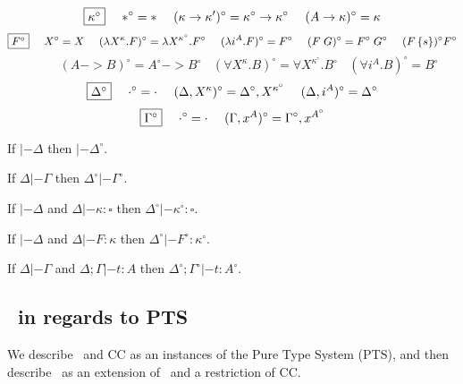 \begin{definition}
\[ \fbox{$\kappa^\circ$}
 ~~~~
 *^\circ =
 *
 ~~~~
 (\kappa -> \kappa')^\circ =
 \kappa^\circ -> \kappa^\circ
 ~~~~
 (A -> \kappa)^\circ =
 \kappa
\]
\[ \fbox{$F^\circ$}
 ~~~~
 X^\circ =
 X
 ~~~~
 (\lambda X^\kappa.F)^\circ =
 \lambda X^{\kappa^\circ}.F^\circ
 ~~~~
 (\lambda i^A.F)^\circ =
 F^\circ
 ~~~~
 (F\;G)^\circ =
 F^\circ\;G^\circ
 ~~~~
 (F\,\{s\})^\circ
 F^\circ
\]
\[ ~~~~ ~~~~ ~~~~
 (A -> B)^\circ =
 A^\circ -> B^\circ
 ~~~~
 (\forall X^\kappa . B)^\circ =
 \forall X^{\kappa^\circ} . B^\circ
 ~~~~
 (\forall i^A . B)^\circ =
 B^\circ
\]
\[ \fbox{$\Delta^\circ$}
 ~~~~
 \cdot^\circ = \cdot
 ~~~~
 (\Delta,X^\kappa)^\circ = \Delta^\circ,X^{\kappa^\circ}
 ~~~~
 (\Delta,i^A)^\circ = \Delta^\circ
\]
\[ \fbox{$\Gamma^\circ$}
 ~~~~
 \cdot^\circ = \cdot
 ~~~~
 (\Gamma,x^A)^\circ = \Gamma^\circ,x^{A^\circ}
\]
\end{definition}

\begin{lemma}
If $|- \Delta$ then $|- \Delta^\circ$.
\end{lemma}

\begin{lemma}
If $\Delta |- \Gamma$ then $\Delta^\circ |- \Gamma^\circ$.
\end{lemma}

\begin{lemma}
If $|- \Delta$ and $\Delta |- \kappa : \square$
then $\Delta^\circ |- \kappa^\circ : \square$.
\end{lemma}

\begin{lemma}
If $|- \Delta$ and $\Delta |- F : \kappa$
then $\Delta^\circ |- F^\circ : \kappa^\circ$.
\end{lemma}

\begin{theorem}
If $\Delta |- \Gamma$ and $\Delta;\Gamma |- t : A$
then $\Delta^\circ;\Gamma^\circ |- t : A^\circ$.
\end{theorem}


\subsection{\Fi\ in regards to PTS}
We describe \Fw\ and CC as an instances of the Pure Type System (PTS),
and then describe \Fi\ as an extension of \Fw\ and a restriction of CC.

